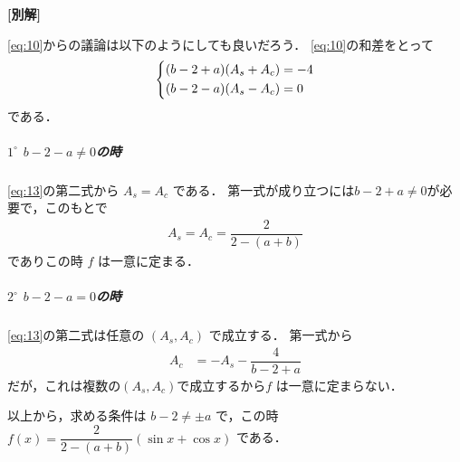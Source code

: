 \documentclass[../../main.tex]{subfiles}
\begin{document}
{\bf [別解]}

\cref{eq:10}からの議論は以下のようにしても良いだろう．
\cref{eq:10}の和差をとって
\begin{align}
  \begin{dcases}
    (b-2+a)(A_{s}+A_{c}) = -4 \\
    (b-2-a)(A_{s}-A_{c}) = 0
  \end{dcases} \label{eq:13}
\end{align}
である．

\subparagraph{$1^\circ$ $b-2-a \neq 0$の時}

\cref{eq:13}の第二式から $A_{s}=A_{c}$ である．
第一式が成り立つには$b-2+a\neq 0$が必要で，このもとで
\begin{align}
  A_{s} = A_{c} = \dfrac{2}{2-(a+b)}
\end{align}
でありこの時 $f$ は一意に定まる．

\subparagraph{$2^\circ$  $b-2-a = 0$の時}

\cref{eq:13}の第二式は任意の $(A_{s},A_{c})$ で成立する．
第一式から
\begin{align}
  A_{c} &= -A_{s} - \dfrac{4}{b-2+a}
\end{align}
だが，これは複数の$(A_{s},A_{c})$で成立するから$f$ は一意に定まらない．
\casesend

以上から，求める条件は $b-2 \neq \pm a$ で，この時 $f(x) = \dfrac{2}{2-(a+b)}(\sin x + \cos x)$ である．

%
\end{document}
